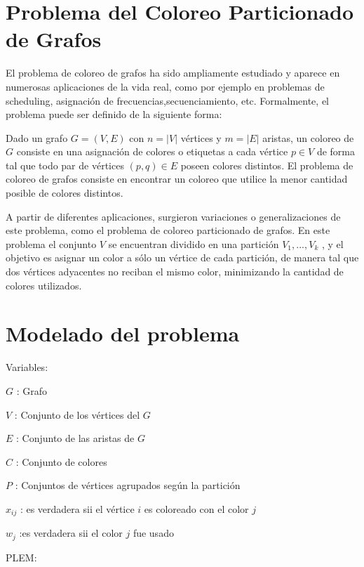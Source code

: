 \documentclass[a4paper]{article}
\begin{document}
\newpage

\section{Problema del Coloreo Particionado de Grafos}

El problema de coloreo de grafos ha sido ampliamente estudiado y aparece en numerosas aplicaciones de la vida real, como por ejemplo en problemas de scheduling, asignación de frecuencias,secuenciamiento, etc. Formalmente, el problema puede ser definido de la siguiente forma: 

Dado un grafo $G = (V,E)$ con $n = |V|$ vértices y $m = |E|$ aristas, un coloreo de $G$ consiste en una asignación de colores o etiquetas a cada vértice $p\in V$ de forma tal que todo par de vértices $(p, q) \in E$ poseen colores distintos. El problema de coloreo de grafos consiste en encontrar un coloreo que utilice la menor cantidad posible de colores distintos.

A partir de diferentes aplicaciones, surgieron variaciones o generalizaciones de este problema, como el problema de coloreo particionado de grafos. En este problema el conjunto $V$ se encuentran dividido en una partición $V_1 , . . . , V_k$ , y el objetivo es asignar un color a sólo un vértice de cada partición, de manera tal que dos vértices adyacentes no reciban el mismo color, minimizando la cantidad de colores utilizados.

\newpage

\section{Modelado del problema}


Variables:

$G$ : Grafo

$V$ : Conjunto de los vértices del $G$

$E$ : Conjunto de las aristas de $G$

$C$ : Conjunto de colores

$P$ : Conjuntos de vértices agrupados según la partición

$x_{ij}$ : es verdadera sii el vértice $i$ es coloreado con el color $j$

$w_j$ :es verdadera sii el color $j$ fue usado

PLEM:
\end{document}
